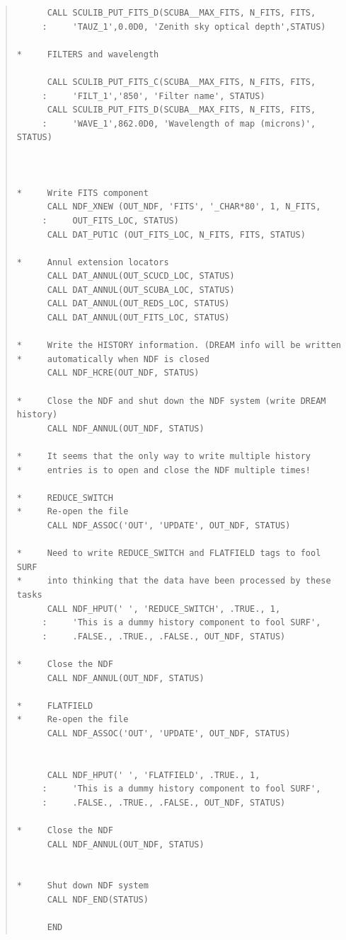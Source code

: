 \documentclass[twoside,11pt]{article}
\newenvironment{myquote}{\begin{quote}\begin{small}}{\end{small}\end{quote}}
\renewcommand{\_}{\texttt{\symbol{95}}}
\begin{document}
\begin{myquote}
\begin{verbatim}
      CALL SCULIB_PUT_FITS_D(SCUBA__MAX_FITS, N_FITS, FITS,
     :     'TAUZ_1',0.0D0, 'Zenith sky optical depth',STATUS)

*     FILTERS and wavelength

      CALL SCULIB_PUT_FITS_C(SCUBA__MAX_FITS, N_FITS, FITS,
     :     'FILT_1','850', 'Filter name', STATUS)
      CALL SCULIB_PUT_FITS_D(SCUBA__MAX_FITS, N_FITS, FITS,
     :     'WAVE_1',862.0D0, 'Wavelength of map (microns)', STATUS)



*     Write FITS component
      CALL NDF_XNEW (OUT_NDF, 'FITS', '_CHAR*80', 1, N_FITS, 
     :     OUT_FITS_LOC, STATUS)
      CALL DAT_PUT1C (OUT_FITS_LOC, N_FITS, FITS, STATUS)

*     Annul extension locators
      CALL DAT_ANNUL(OUT_SCUCD_LOC, STATUS)
      CALL DAT_ANNUL(OUT_SCUBA_LOC, STATUS)
      CALL DAT_ANNUL(OUT_REDS_LOC, STATUS)
      CALL DAT_ANNUL(OUT_FITS_LOC, STATUS)

*     Write the HISTORY information. (DREAM info will be written
*     automatically when NDF is closed
      CALL NDF_HCRE(OUT_NDF, STATUS)

*     Close the NDF and shut down the NDF system (write DREAM history)
      CALL NDF_ANNUL(OUT_NDF, STATUS)
 
*     It seems that the only way to write multiple history
*     entries is to open and close the NDF multiple times!

*     REDUCE_SWITCH
*     Re-open the file
      CALL NDF_ASSOC('OUT', 'UPDATE', OUT_NDF, STATUS)

*     Need to write REDUCE_SWITCH and FLATFIELD tags to fool SURF
*     into thinking that the data have been processed by these tasks
      CALL NDF_HPUT(' ', 'REDUCE_SWITCH', .TRUE., 1, 
     :     'This is a dummy history component to fool SURF',
     :     .FALSE., .TRUE., .FALSE., OUT_NDF, STATUS)

*     Close the NDF
      CALL NDF_ANNUL(OUT_NDF, STATUS)

*     FLATFIELD
*     Re-open the file
      CALL NDF_ASSOC('OUT', 'UPDATE', OUT_NDF, STATUS)


      CALL NDF_HPUT(' ', 'FLATFIELD', .TRUE., 1, 
     :     'This is a dummy history component to fool SURF',
     :     .FALSE., .TRUE., .FALSE., OUT_NDF, STATUS)

*     Close the NDF
      CALL NDF_ANNUL(OUT_NDF, STATUS)


*     Shut down NDF system
      CALL NDF_END(STATUS)

      END
\end{verbatim}
\end{myquote}
\end{document}
